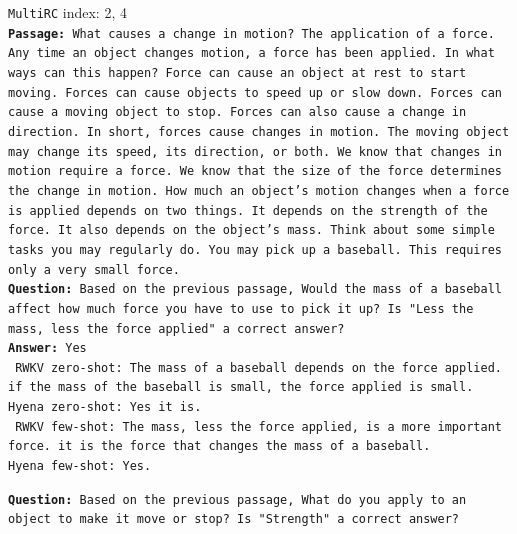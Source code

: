 \begin{tcolorbox}
    {\tt MultiRC} index: 2, 4 \\ 
    
    \small {\tt \textbf{Passage:} What causes a change in motion? The application of a force. Any time an object changes motion, a force has been applied. In what ways can this happen? Force can cause an object at rest to start moving. Forces can cause objects to speed up or slow down. Forces can cause a moving object to stop. Forces can also cause a change in direction. In short, forces cause changes in motion. The moving object may change its speed, its direction, or both. We know that changes in motion require a force. We know that the size of the force determines the change in motion. How much an object's motion changes when a force is applied depends on two things. It depends on the strength of the force. It also depends on the object's mass. Think about some simple tasks you may regularly do. You may pick up a baseball. This requires only a very small force.} \\ 
    
    {\tt \textbf{Question:} Based on the previous passage, Would the mass of a baseball affect how much force you have to use to pick it up? Is "Less the mass, less the force applied" a correct answer?} \\

    {\tt \textbf{Answer:} Yes} \\ 

    {\tt {\color{red!80} RWKV zero-shot}: The mass of a baseball depends on the force applied. if the mass of the baseball is small, the force applied is small.}  \\ 

    {\tt {\color{blue!80}Hyena zero-shot}: Yes it is.}  \\

    {\tt {\color{red!80} RWKV few-shot}: The mass, less the force applied, is a more important force. it is the force that changes the mass of a baseball.} \\

    {\tt {\color{blue!80}Hyena few-shot}: Yes.} 

    \vspace{1cm}
    
     {\tt \textbf{Question:} Based on the previous passage, What do you apply to an object to make it move or stop? Is "Strength" a correct answer?} \\


\end{tcolorbox}

